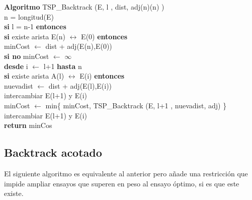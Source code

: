 \documentclass[es]{ifirak}
\begin{document}
{	\textbf{Algoritmo} TSP\_Backtrack (E, l , dist, adj(n)(n) )\\
\hspace*{0.8cm}	 n = longitud(E) \\	
\hspace*{0.8cm}	\textbf{si} l = n-1 \textbf{entonces}\\ 
\hspace*{0.4cm}\hspace*{2cm}	\textbf{si} existe arista E(n) $\leftrightarrow$ E(0) \textbf{entonces}\\
\hspace*{0.4cm}\hspace*{2.6cm}	 minCost $\leftarrow$ dist + adj(E(n),E(0)) \\
\hspace*{0.8cm}	\textbf{si no} minCost $\leftarrow$ $ \infty$\\
\hspace*{0.4cm}\hspace*{2cm}	\textbf{desde} i $\leftarrow$ l+1 \textbf{hasta} n\\
\hspace*{0.4cm}\hspace*{2cm}	\textbf{si} existe arista A(l) $\leftrightarrow$ E(i) \textbf{entonces}\\ 
\hspace*{0.4cm}\hspace*{2.6cm}	nuevadist $\leftarrow$ dist + adj(E(l),E(i))\\
\hspace*{0.4cm}\hspace*{2.6cm}	intercambiar E(l+1) y E(i)\\
\hspace*{0.4cm}\hspace*{2.6cm}	minCost  $\leftarrow$ min\{ minCost, TSP\_Backtrack (E, l+1 , nuevadist, adj) \}\\
\hspace*{0.4cm}\hspace*{2.6cm}	intercambiar E(l+1) y E(i)\\
\hspace*{0.8cm}	\textbf{return} minCos\\
	
	\subsection{Backtrack acotado}
	
	El siguiente algoritmo es equivalente al anterior pero añade una restricción que impide ampliar ensayos que superen en peso al ensayo óptimo, si es que este existe.
	
}
\end{document}
